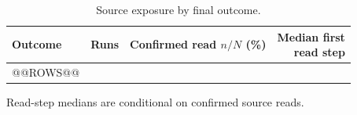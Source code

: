 \begin{table}[tbp]
  \centering
    \caption{Source exposure by final outcome.}
    \label{tab:source-exposure}

    \centering
    \footnotesize

    \begin{tabular}{@{}lrrr@{}}
      \toprule
      Outcome
        & Runs
        & \shortstack{Confirmed read\\$n/N$ (\%)}
        & \shortstack{Median first\\read step} \\
      \midrule
@@ROWS@@

      \bottomrule
    \end{tabular}

    \par\smallskip
    {\scriptsize
    Read-step medians are conditional on confirmed source reads.
    }
\end{table}
